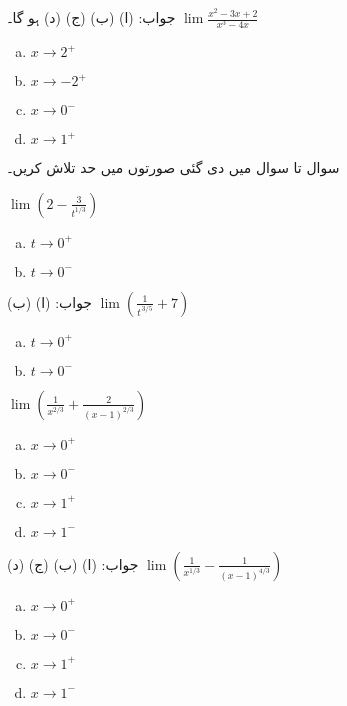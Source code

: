 جواب:\quad
(ا)  (ب)  (ج)  (د)  ہو گا۔
$\lim\tfrac{x^2-3x+2}{x^3-4x}$
\begin{multicols}{4}
\begin{enumerate}[a.]
\item
$x\to 2^+$
\item
$x\to -2^+$
\item
$x\to 0^-$
\item
$x\to 1^+$
\end{enumerate}
\end{multicols}
سوال  تا سوال  میں دی گئی صورتوں میں حد تلاش کریں۔

$\lim(2-\tfrac{3}{t^{1/3}})$
\begin{multicols}{4}
\begin{enumerate}[a.]
\item
$t\to 0^+$
\item
$t\to 0^-$
\end{enumerate}
\end{multicols}
جواب:\quad
(ا)  (ب) 
$\lim(\tfrac{1}{t^{\,3/5}}+7)$
\begin{multicols}{4}
\begin{enumerate}[a.]
\item
$t\to 0^+$
\item
$t\to 0^-$
\end{enumerate}
\end{multicols}
$\lim(\tfrac{1}{x^{2/3}}+\tfrac{2}{(x-1)^{2/3}})$
\begin{multicols}{4}
\begin{enumerate}[a.]
\item
$x\to 0^+$
\item
$x\to 0^-$
\item
$x\to 1^+$
\item
$x\to 1^-$
\end{enumerate}
\end{multicols}
جواب:\quad
(ا)  (ب)  (ج)  (د) 
$\lim(\tfrac{1}{x^{1/3}}-\tfrac{1}{(x-1)^{4/3}})$
\begin{multicols}{4}
\begin{enumerate}[a.]
\item
$x\to 0^+$
\item
$x\to 0^-$
\item
$x\to 1^+$
\item
$x\to 1^-$
\end{enumerate}
\end{multicols}

